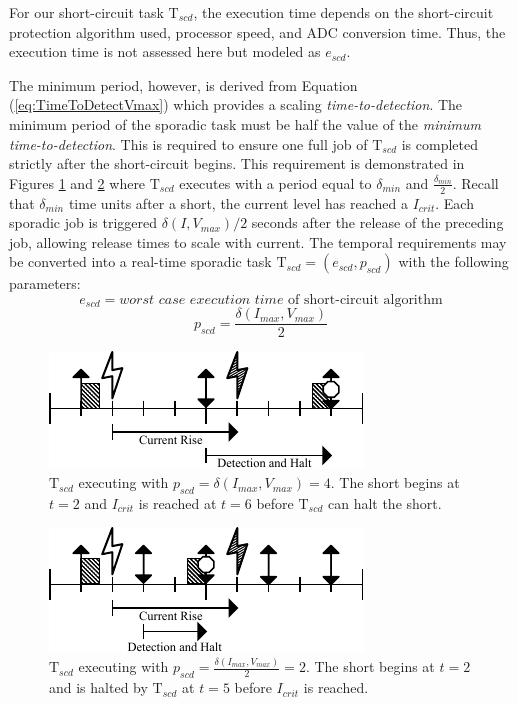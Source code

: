 \documentclass[11pt,compsoc,oneside]{report}
\begin{document}
For our short-circuit task $\mathrm{T}_{scd}$, the execution time depends on the short-circuit protection algorithm used, processor speed, and ADC conversion time. Thus, the execution time is not assessed here but modeled as $e_{scd}$.

The minimum period, however, is derived from Equation (\ref{eq:TimeToDetectVmax}) which provides a scaling \textit{time-to-detection}. The minimum period of the sporadic task must be half the value of the \textit{minimum time-to-detection}. This is required to ensure one full job of $\mathrm{T}_{scd}$ is completed strictly after the short-circuit begins. This requirement is demonstrated in Figures \ref{fig:shortedschedule} and \ref{fig:stoppedschedule} where $\mathrm{T}_{scd}$ executes with a period equal to $\delta_{min}$ and $\frac{\delta_{min}}{2}$. Recall that $\delta_{min}$ time units after a short, the current level has reached a $I_{crit}$. Each sporadic job is triggered $\delta(I,V_{max})/2$ seconds after the release of the preceding job, allowing release times to scale with current. The temporal requirements may be converted into a real-time sporadic task $\mathrm{T}_{scd} = (e_{scd}, p_{scd})$ with the following parameters:
\begin{equation}\label{eq:ExecutionTime}
e_{scd} = \textit{worst case execution time }\text{of short-circuit algorithm}
\end{equation}
\begin{equation}\label{eq:Period}
p_{scd} = \frac{\delta(I_{max},V_{max})}{2}
\end{equation}
\begin{figure}
	\centering
    \includegraphics[scale=1.8]{img/shortedschedule.pdf}
    \caption{$\mathrm{T}_{scd}$ executing with $p_{scd} = \delta(I_{max},V_{max}) = 4$. The short begins at $t = 2$ and $I_{crit}$ is reached at $t = 6$ before $\mathrm{T}_{scd}$ can halt the short.}
    \label{fig:shortedschedule}
\end{figure}
\begin{figure}
	\centering
    \includegraphics[scale=1.8]{img/stoppedschedule.pdf}
    \caption{$\mathrm{T}_{scd}$ executing with $p_{scd} = \frac{\delta(I_{max},V_{max})}{2} = 2$. The short begins at $t = 2$ and is halted by $\mathrm{T}_{scd}$ at $t = 5$ before $I_{crit}$ is reached.}
    \label{fig:stoppedschedule}
\end{figure}
\end{document}
